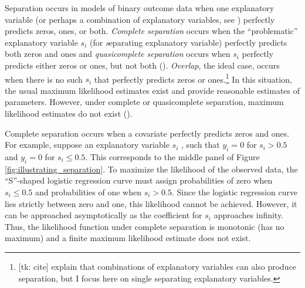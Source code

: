 \documentclass[12pt]{article}
\begin{document}
Separation occurs in models of binary outcome data when one explanatory variable (or perhaps a combination of explanatory variables, see \cite{LesaffreAlbert1989}) perfectly predicts zeros, ones, or both. \textit{Complete separation} occurs when the ``problematic'' explanatory variable $s_i$ (for \textit{s}eparating explanatory variable) perfectly predicts both zeros and ones and \textit{quasicomplete separation} occurs when $s_i$ perfectly predicts either zeros or ones, but not both (\citealt{AlbertAnderson1984, Zorn2005}). \textit{Overlap}, the ideal case, occurs when there is no such $s_i$ that perfectly predicts zeros or ones.\footnote{[tk: cite] explain that combinations of explanatory variables can also produce separation, but I focus here on single separating explanatory variables.} In this situation, the usual maximum likelihood estimates exist and provide reasonable estimates of parameters. However, under complete or quasicomplete separation, maximum likelihood estimates do not exist (\citealt{AlbertAnderson1984, Zorn2005}).

Complete separation occurs when a covariate perfectly predicts zeros and ones. For example, suppose an explanatory variable $s_i$ , such that $y_i = 0$ for $s_i > 0.5$ and $y_i = 0$ for $s_i \leq 0.5$. This corresponds to the middle panel of Figure \ref{fig:illustrating_separation}.  To maximize the likelihood of the observed data, the ``S''-shaped logistic regression curve must assign probabilities of zero when $s_i \leq 0.5$ and probabilities of one when $s_i > 0.5$. Since the logistic regression curve lies strictly between zero and one, this likelihood cannot be achieved. However, it can be approached asymptotically as the coefficient for $s_i$ approaches infinity. Thus, the likelihood function under complete separation is monotonic (has no maximum) and a finite maximum likelihood estimate does not exist.
\end{document}
